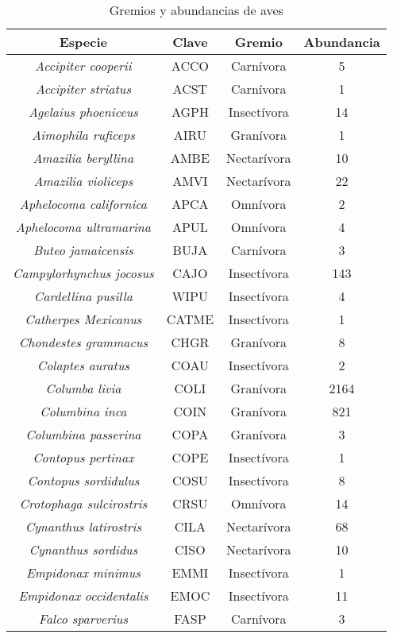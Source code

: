 \documentclass[letterpaper,12pt]{article}
\begin{document}
{\scriptsize
\begin{longtable}[c] {|c|c|c|c|} 
\caption{Gremios y abundancias de aves} \\ \toprule
Especie & Clave & Gremio  & Abundancia  \\ \midrule
\textit{Accipiter cooperii} & ACCO & Carnívora & 5\\
\textit{Accipiter striatus} & ACST & Carnívora & 1\\
\textit{Agelaius phoeniceus} & AGPH & Insectívora & 14\\
\textit{Aimophila ruficeps} & AIRU & Granívora & 1\\
\textit{Amazilia beryllina} & AMBE & Nectarívora & 10\\
\textit{Amazilia violiceps} & AMVI & Nectarívora & 22\\
\textit{Aphelocoma californica} & APCA & Omnívora& 2\\
\textit{Aphelocoma ultramarina} & APUL & Omnívora & 4\\
\textit{Buteo jamaicensis} & BUJA & Carnívora & 3\\
\textit{Campylorhynchus jocosus} & CAJO & Insectívora & 143\\
\textit{Cardellina pusilla} & WIPU & Insectívora & 4\\
\textit{Catherpes Mexicanus} & CATME & Insectívora & 1\\
\textit{Chondestes grammacus} & CHGR & Granívora & 8\\
\textit{Colaptes auratus} & COAU & Insectívora & 2\\
\textit{Columba livia} & COLI & Granívora & 2164\\
\textit{Columbina inca} & COIN & Granívora & 821\\
\textit{Columbina passerina} & COPA & Granívora & 3\\
\textit{Contopus pertinax} & COPE & Insectívora & 1\\
\textit{Contopus sordidulus} & COSU & Insectívora & 8\\
\textit{Crotophaga sulcirostris} & CRSU & Omnívora & 14\\
\textit{Cynanthus latirostris} & CILA & Nectarívora & 68\\
\textit{Cynanthus sordidus} & CISO & Nectarívora & 10\\
\textit{Empidonax minimus} & EMMI & Insectívora & 1\\
\textit{Empidonax occidentalis} & EMOC & Insectívora & 11\\
\textit{Falco sparverius} & FASP & Carnívora & 3\\

\end{longtable}}
\end{document}
